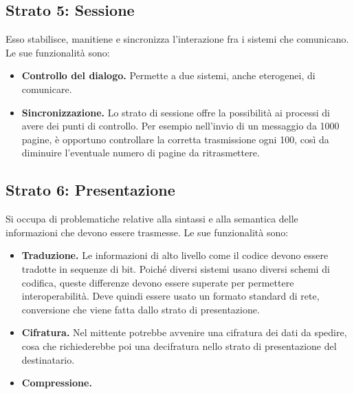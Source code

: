     \subsection{Strato 5: Sessione}
        Esso stabilisce, manitiene e sincronizza l'interazione fra i sistemi che comunicano. Le sue funzionalità sono:
        \begin{itemize}
            \item \textbf{Controllo del dialogo.} Permette a due sistemi, anche eterogenei, di comunicare.
            
            \item \textbf{Sincronizzazione.} Lo strato di sessione offre la possibilità ai processi di avere dei punti di controllo. Per esempio nell'invio di un messaggio da 1000 pagine, è opportuno controllare la corretta trasmissione ogni 100, così da diminuire l'eventuale numero di pagine da ritrasmettere.
        \end{itemize}
        
    \subsection{Strato 6: Presentazione}
        Si occupa di problematiche relative alla sintassi e alla semantica delle informazioni che devono essere trasmesse. Le sue funzionalità sono:
        \begin{itemize}
            \item \textbf{Traduzione.} Le informazioni di alto livello come il codice devono essere tradotte in sequenze di bit. Poiché diversi sistemi usano diversi schemi di codifica, queste differenze devono essere superate per permettere interoperabilità. Deve quindi essere usato un formato standard di rete, conversione che viene fatta dallo strato di presentazione.
            
            \item \textbf{Cifratura.} Nel mittente potrebbe avvenire una cifratura dei dati da spedire, cosa che richiederebbe poi una decifratura nello strato di presentazione del destinatario.
            
            \item \textbf{Compressione.}
        \end{itemize}
        
